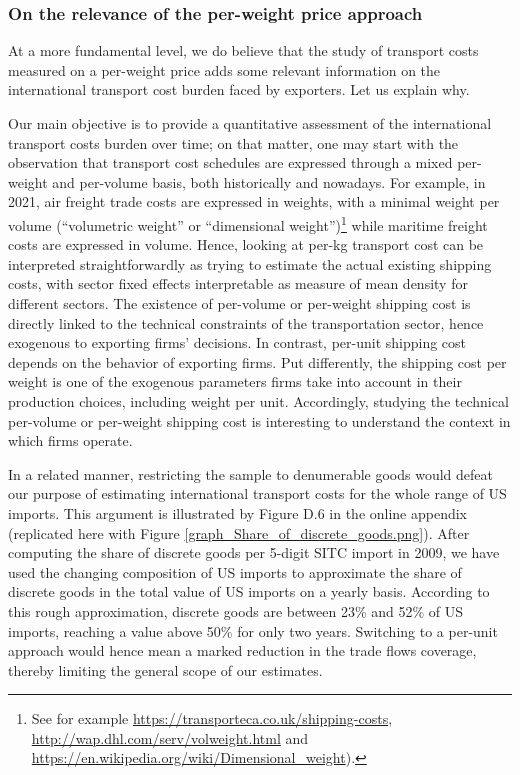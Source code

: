 \documentclass[a4paper,11pt]{article}
\begin{document}
\subsubsection{On the relevance of the per-weight price approach}
At a more fundamental level, we do believe that the study of transport costs measured on a per-weight price adds some relevant information on the international transport cost burden faced by exporters. Let us explain why.

Our main objective is to provide a quantitative assessment of the international transport costs burden over time; on that matter, one may start with the observation that transport cost schedules are expressed through a mixed per-weight and per-volume basis, both historically and nowadays. For example, in 2021, air freight trade costs are expressed in weights, with a minimal weight per volume (``volumetric weight'' or ``dimensional weight'')\footnote{See for example \href{https://transporteca.co.uk/shipping-costs}{https://transporteca.co.uk/shipping-costs}, \href{http://wap.dhl.com/serv/volweight.html}{http://wap.dhl.com/serv/volweight.html} and \href{https://en.wikipedia.org/wiki/Dimensional_weight}{ https://en.wikipedia.org/wiki/Dimensional\_weight}).} while maritime freight costs are expressed in volume.
Hence, looking at per-kg transport cost can be interpreted straightforwardly as trying to estimate the actual existing shipping costs, with sector fixed effects interpretable as measure of mean density for different sectors. The existence of per-volume or per-weight shipping cost is directly linked to the technical constraints of the transportation sector, hence exogenous to exporting firms' decisions. In contrast, per-unit shipping cost depends on the behavior of exporting firms. Put differently, the shipping cost per weight is one of the exogenous parameters firms take into account in their production choices, including weight per unit. Accordingly, studying the technical per-volume or per-weight shipping cost is interesting to understand the context in which firms operate.

In a related manner, restricting the sample to denumerable goods would defeat our purpose of estimating international transport costs for the whole range of US imports. This argument is illustrated by Figure D.6 in the online appendix (replicated here with Figure \ref{graph_Share_of_discrete_goods.png}). After computing the share of discrete goods per 5-digit SITC import in 2009, we have used the changing composition of US imports to approximate the share of discrete goods in the total value of US imports on a yearly basis. According to this rough approximation, discrete goods are between 23\% and 52\% of US imports, reaching a value above 50\% for only two years. Switching to a per-unit approach would hence mean a marked reduction in the trade flows coverage, thereby limiting the general scope of our estimates.
\end{document}
